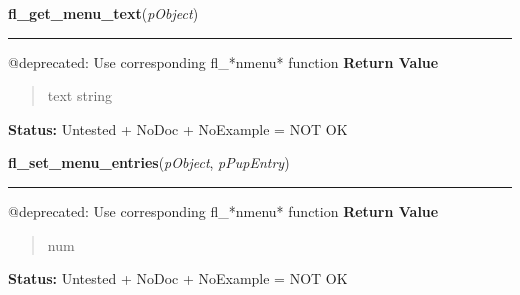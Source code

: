     \label{xformslib:deprecated:fl_get_menu_text}

    \vspace{0.5ex}

\hspace{.8\funcindent}\begin{boxedminipage}{\funcwidth}

    \raggedright \textbf{fl\_get\_menu\_text}(\textit{pObject})

    \vspace{-1.5ex}

    \rule{\textwidth}{0.5\fboxrule}
\setlength{\parskip}{2ex}

@deprecated: Use corresponding fl\_*nmenu* function
\setlength{\parskip}{1ex}
      \textbf{Return Value}
    \vspace{-1ex}

      \begin{quote}

text string
      \end{quote}

\textbf{Status:} 
Untested + NoDoc + NoExample = NOT OK


    \end{boxedminipage}

    \label{xformslib:deprecated:fl_set_menu_entries}

    \vspace{0.5ex}

\hspace{.8\funcindent}\begin{boxedminipage}{\funcwidth}

    \raggedright \textbf{fl\_set\_menu\_entries}(\textit{pObject}, \textit{pPupEntry})

    \vspace{-1.5ex}

    \rule{\textwidth}{0.5\fboxrule}
\setlength{\parskip}{2ex}

@deprecated: Use corresponding fl\_*nmenu* function
\setlength{\parskip}{1ex}
      \textbf{Return Value}
    \vspace{-1ex}

      \begin{quote}

num
      \end{quote}

\textbf{Status:} 
Untested + NoDoc + NoExample = NOT OK


    \end{boxedminipage}


